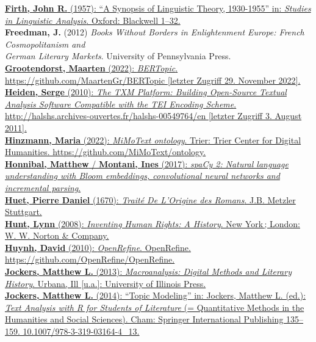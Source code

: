 \documentclass[
  12pt,
  letterpaper,
  DIV=11,
  numbers=noendperiod]{scrreprt}
\begin{document}
\href{https://www.zotero.org/google-docs/?fqBRoB}{\textbf{Firth, John
R.} (1957): ``A Synopsis of Linguistic Theory, 1930-1955'' in:
\emph{Studies in Linguistic Analysis}. Oxford: Blackwell 1--32.}\\
\textbf{Freedman, J.} (2012) \emph{Books Without Borders in
Enlightenment Europe: French Cosmopolitanism and}\\
\emph{German Literary Markets}. University of Pennsylvania Press.\\
\href{https://www.zotero.org/google-docs/?fqBRoB}{\textbf{Grootendorst,
Maarten} (2022): \emph{BERTopic}. https://github.com/MaartenGr/BERTopic
{[}letzter Zugriff 29. November 2022{]}.}\\
\href{https://www.zotero.org/google-docs/?fqBRoB}{\textbf{Heiden, Serge}
(2010): \emph{The TXM Platform: Building Open-Source Textual Analysis
Software Compatible with the TEI Encoding Scheme}.
http://halshs.archives-ouvertes.fr/halshs-00549764/en {[}letzter Zugriff
3. August 2011{]}.}\\
\href{https://www.zotero.org/google-docs/?fqBRoB}{\textbf{Hinzmann,
Maria} (2022): \emph{MiMoText ontology}. Trier: Trier Center for Digital
Humanities. https://github.com/MiMoText/ontology.}\\
\href{https://www.zotero.org/google-docs/?fqBRoB}{\textbf{Honnibal,
Matthew} / \textbf{Montani, Ines} (2017): \emph{spaCy 2: Natural
language understanding with Bloom embeddings, convolutional neural
networks and incremental parsing}.}\\
\href{https://www.zotero.org/google-docs/?fqBRoB}{\textbf{Huet, Pierre
Daniel} (1670): \emph{Traité De L'Origine des Romans}. J.B. Metzler
Stuttgart.}\\
\href{https://www.zotero.org/google-docs/?fqBRoB}{\textbf{Hunt, Lynn}
(2008): \emph{Inventing Human Rights: A History}. New York\,; London: W.
W. Norton \& Company.}\\
\href{https://www.zotero.org/google-docs/?fqBRoB}{\textbf{Huynh, David}
(2010): \emph{OpenRefine}. OpenRefine.
https://github.com/OpenRefine/OpenRefine.}\\
\href{https://www.zotero.org/google-docs/?fqBRoB}{\textbf{Jockers,
Matthew L.} (2013): \emph{Macroanalysis: Digital Methods and Literary
History}. Urbana, Ill {[}u.a.{]}: University of Illinois Press.}\\
\href{https://www.zotero.org/google-docs/?fqBRoB}{\textbf{Jockers,
Matthew L.} (2014): ``Topic Modeling'' in: Jockers, Matthew L. (ed.):
\emph{Text Analysis with R for Students of Literature} (= Quantitative
Methods in the Humanities and Social Sciences). Cham: Springer
International Publishing 135--159. 10.1007/978-3-319-03164-4\_13.}\\
\end{document}
